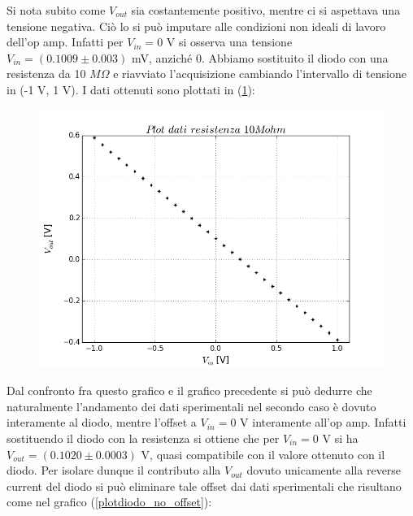 \documentclass[journal, a4paper]{IEEEtran}
\begin{document}
Si nota subito come $V_{out}$ sia costantemente positivo, mentre ci si aspettava una tensione negativa. Ciò lo si può imputare alle condizioni non ideali di lavoro dell'op amp. Infatti per $V_{in} = 0$ V si osserva una tensione $V_{in} = (0.1009 \pm 0.003)$ mV, anziché 0. Abbiamo sostituito il diodo con una resistenza da 10 $M\Omega$ e riavviato l'acquisizione cambiando l'intervallo di tensione in (-1 V, 1 V). I dati ottenuti sono plottati in (\ref{plotdiodores}):\\

\begin{figure}[htp]
\caption{}
\label{plotdiodores}
\centering
\includegraphics[scale=.35]{plotdiodores}
\end{figure}

Dal confronto fra questo grafico e il grafico precedente si può dedurre che naturalmente l'andamento dei dati sperimentali nel secondo caso è dovuto interamente al diodo, mentre l'offset a $V_{in} = 0$ V interamente all'op amp. Infatti sostituendo il diodo con la resistenza si ottiene che per $V_{in} = 0$ V si ha $V_{out} = (0.1020 \pm 0.0003)$ V, quasi compatibile con il valore ottenuto con il diodo. Per isolare dunque il contributo alla $V_{out}$ dovuto unicamente alla reverse current del diodo si può eliminare tale offset dai dati sperimentali che risultano come nel grafico (\ref{plotdiodo_no_offset}):
\end{document}
